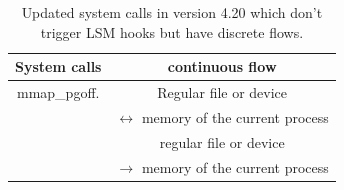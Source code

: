 \begin{table}[ht]
	\caption{Updated system calls in version 4.20 which don't trigger LSM hooks but have discrete flows.}
	\centering
	\begin{tabular}{c c}
		\hline\hline 
		System calls & continuous flow  \\
		\hline
	
		mmap\_pgoff. & Regular file or device  \\
		& $\leftrightarrow$ memory of the current process \\
		& regular file or device  \\
		& $\rightarrow$ memory of the current process \\
		
	\end{tabular}	
\end{table}


